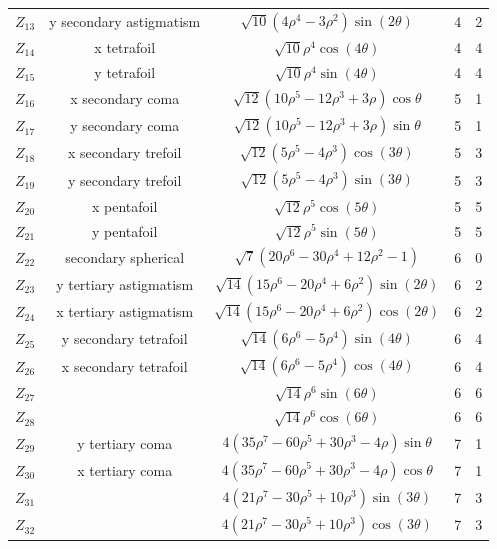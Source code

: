 \begin{table}[htbp]
{\begin{tabular}{|c|c|c|c|c|}
$Z_{13}$ & y secondary astigmatism & $\sqrt{10}(4\rho^4-3\rho^2)\sin(2\theta) $ & 4 & 2 \\ %
$Z_{14}$ & x tetrafoil & $\sqrt{10}\rho^4 \cos(4\theta) $ & 4 & 4 \\ %
$Z_{15}$ & y tetrafoil & $\sqrt{10}\rho^4 \sin(4\theta) $  & 4 & 4 \\ %
$Z_{16}$ & x secondary coma & $\sqrt{12}(10\rho^5-12\rho^3+3\rho) \cos \theta $ & 5 & 1 \\ %
$Z_{17}$ & y secondary coma & $\sqrt{12}(10\rho^5-12\rho^3+3\rho) \sin \theta $ & 5 & 1 \\ %
$Z_{18}$ & x secondary trefoil & $\sqrt{12}(5\rho^5-4\rho^3) \cos (3\theta) $ & 5 & 3 \\ %
$Z_{19}$ & y secondary trefoil & $\sqrt{12}(5\rho^5-4\rho^3) \sin (3\theta) $ & 5 & 3 \\ %
$Z_{20}$ & x pentafoil & $\sqrt{12}\rho^5 \cos (5\theta) $ & 5 & 5 \\ %
$Z_{21}$ & y pentafoil & $\sqrt{12}\rho^5 \sin (5\theta) $  & 5 & 5 \\ %
$Z_{22}$ & secondary spherical & $\sqrt{7}(20\rho^6-30\rho^4+12\rho^2-1) $  & 6 & 0 \\ %
$Z_{23}$ & y tertiary astigmatism & $\sqrt{14}(15\rho^6-20\rho^4+6\rho^2)\sin (2\theta) $ & 6 & 2 \\ %
$Z_{24}$ & x tertiary astigmatism & $\sqrt{14}(15\rho^6-20\rho^4+6\rho^2)\cos (2\theta) $ & 6 & 2 \\ %
$Z_{25}$ & y secondary tetrafoil & $\sqrt{14}(6\rho^6-5\rho^4)\sin (4\theta) $ & 6 & 4 \\ %
$Z_{26}$ & x secondary tetrafoil & $\sqrt{14}(6\rho^6-5\rho^4)\cos (4\theta) $ & 6 & 4 \\ %
$Z_{27}$ &  & $\sqrt{14}\rho^6 \sin (6\theta) $  & 6 & 6 \\ %
$Z_{28}$ &  & $\sqrt{14}\rho^6 \cos (6\theta) $ & 6 & 6 \\ %
$Z_{29}$ & y tertiary coma & $4 (35\rho^7-60\rho^5+30\rho^3-4\rho)\sin \theta $ & 7 & 1 \\ %
$Z_{30}$ & x tertiary coma & $4 (35\rho^7-60\rho^5+30\rho^3-4\rho)\cos \theta $ & 7 & 1 \\ %
$Z_{31}$ &  & $4 (21\rho^7-30\rho^5+10\rho^3)\sin (3\theta) $ & 7 & 3 \\ %
$Z_{32}$ &  & $4 (21\rho^7-30\rho^5+10\rho^3)\cos (3\theta) $  & 7 & 3 \\ %

\end{tabular}}
\end{table}
